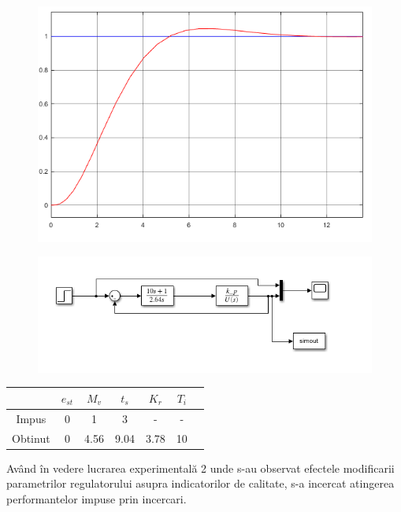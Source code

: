 \documentclass[11pt]{article}
\begin{document}
\begin{figure}[H]
	\centering
	\begin{minipage}{.4\textwidth}
		\centering
		\includegraphics[width=.9\linewidth]{CMVK.png}
		\label{fig:test1}
	\end{minipage}%
	\begin{minipage}{.6\textwidth}
		\centering
		\includegraphics[width=.9\linewidth]{sim_cmvk.png}
		\label{fig:test2}
	\end{minipage}
\end{figure}
\begin{center}
	\begin{tabular}{|c|c|c|c|c|c|c|}
		\hline
		&$e_{st}$&$M_v$&$t_s$&$K_r$&$T_i$\\
		\hline
		Impus&0&1&3&-&-\\
		\hline
		Obtinut&0&4.56&9.04&3.78&10\\
		\hline
	\end{tabular}
\end{center}
Având în vedere lucrarea experimentală 2 unde s-au observat efectele modificarii parametrilor regulatorului asupra indicatorilor de calitate, s-a incercat atingerea performantelor impuse prin incercari.
\end{document}
